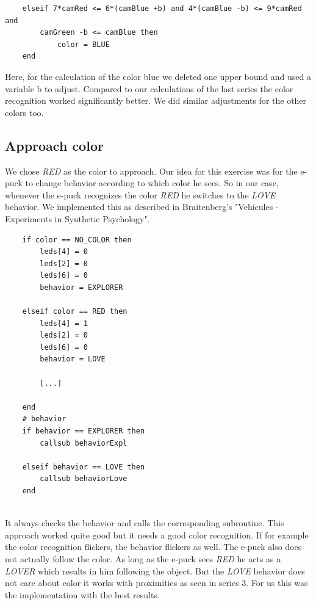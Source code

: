 \documentclass[a4paper]{article}
\begin{document}
			\begin{lstlisting}
	elseif 7*camRed <= 6*(camBlue +b) and 4*(camBlue -b) <= 9*camRed and
		camGreen -b <= camBlue then
			color = BLUE
	end
			\end{lstlisting}
			
			\noindent Here, for the calculation of the color blue we deleted one upper bound and 
			used a variable b to adjust. Compared to our calculations of the last series the color 
			recognition worked significantly better. We did similar adjustments for the other 
			colors too.
			 
		\newpage							
		\subsection{Approach color}
		\noindent We chose \textit{RED} as the color to approach. Our idea for this exercise was 
		for the e-puck to change behavior according to which	color he sees. So in our case, 
		whenever the e-puck recognizes the color \textit{RED} he switches to the \textit{LOVE} 
		behavior. We implemented this as described in Braitenberg's "Vehicules - Experiments in 
		Synthetic Psychology". 
		
		\begin{lstlisting}
	if color == NO_COLOR then
		leds[4] = 0
		leds[2] = 0
		leds[6] = 0
		behavior = EXPLORER
		
	elseif color == RED then
		leds[4] = 1
		leds[2] = 0
		leds[6] = 0
		behavior = LOVE
		
		[...]
		
	end
	# behavior
	if behavior == EXPLORER then
		callsub behaviorExpl
		
	elseif behavior == LOVE then
		callsub behaviorLove
	end
	
		\end{lstlisting}
		
		\noindent It always checks the behavior and calls the corresponding subroutine. This 
		approach worked quite good but it needs a good color recognition. If for example the color 
		recognition flickers, the behavior flickers as well. The e-puck also does not actually 
		follow the color. As long as the e-puck sees \textit{RED} he acts as a \textit{LOVER} 
		which results in him following the object. But the \textit{LOVE} behavior does not care 
		about color it works with proximities as seen in series 3. For us this was the 
		implementation with the best results.\\
		
\end{document}
